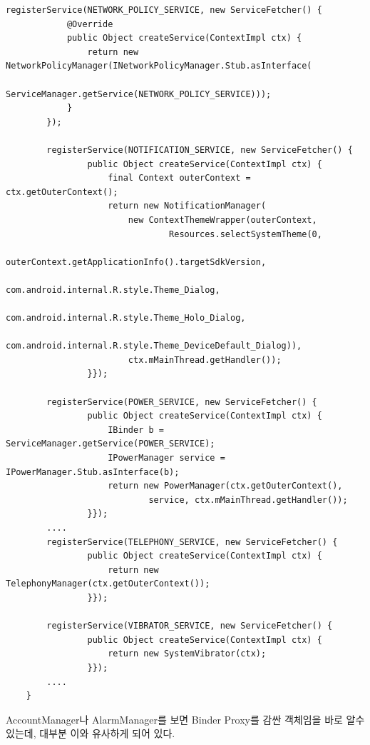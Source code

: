 \begin{lstlisting}[frame=single, caption=ContextImpl.java]
        registerService(NETWORK_POLICY_SERVICE, new ServiceFetcher() {
            @Override
            public Object createService(ContextImpl ctx) {
                return new NetworkPolicyManager(INetworkPolicyManager.Stub.asInterface(
                        ServiceManager.getService(NETWORK_POLICY_SERVICE)));
            }
        });

        registerService(NOTIFICATION_SERVICE, new ServiceFetcher() {
                public Object createService(ContextImpl ctx) {
                    final Context outerContext = ctx.getOuterContext();
                    return new NotificationManager(
                        new ContextThemeWrapper(outerContext,
                                Resources.selectSystemTheme(0,
                                        outerContext.getApplicationInfo().targetSdkVersion,
                                        com.android.internal.R.style.Theme_Dialog,
                                        com.android.internal.R.style.Theme_Holo_Dialog,
                                        com.android.internal.R.style.Theme_DeviceDefault_Dialog)),
                        ctx.mMainThread.getHandler());
                }});

        registerService(POWER_SERVICE, new ServiceFetcher() {
                public Object createService(ContextImpl ctx) {
                    IBinder b = ServiceManager.getService(POWER_SERVICE);
                    IPowerManager service = IPowerManager.Stub.asInterface(b);
                    return new PowerManager(ctx.getOuterContext(),
                            service, ctx.mMainThread.getHandler());
                }});
		....
        registerService(TELEPHONY_SERVICE, new ServiceFetcher() {
                public Object createService(ContextImpl ctx) {
                    return new TelephonyManager(ctx.getOuterContext());
                }});

        registerService(VIBRATOR_SERVICE, new ServiceFetcher() {
                public Object createService(ContextImpl ctx) {
                    return new SystemVibrator(ctx);
                }});
		....
    }
\end{lstlisting}
AccountManager나 AlarmManager를 보면 Binder Proxy를 감싼 객체임을 바로 알수 있는데, 대부분 이와 유사하게 되어 있다.\\


